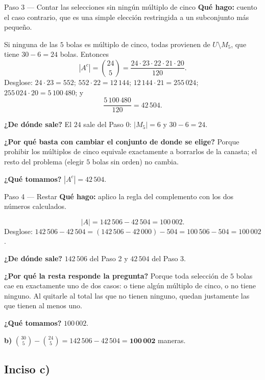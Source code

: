 \documentclass[11pt]{article}
\begin{document}
\begin{paso}{Paso 3 --- Contar las selecciones sin ningún múltiplo de cinco}
\textbf{Qué hago:} cuento el caso contrario, que es una simple elección restringida a un subconjunto más pequeño.

Si ninguna de las $5$ bolas es múltiplo de cinco, todas provienen de $U\setminus M_5$, que tiene $30-6=24$ bolas. Entonces
\[
|A^{c}| = \binom{24}{5} = \frac{24\cdot 23\cdot 22\cdot 21\cdot 20}{120} .
\]
Desglose: $24\cdot 23 = 552$; $552\cdot 22 = 12\,144$; $12\,144\cdot 21 = 255\,024$; $255\,024\cdot 20 = 5\,100\,480$; y
\[
\frac{5\,100\,480}{120} = 42\,504 .
\]

\textbf{¿De dónde sale?} El $24$ sale del Paso 0: $|M_5|=6$ y $30-6=24$.

\textbf{¿Por qué basta con cambiar el conjunto de donde se elige?} Porque prohibir los múltiplos de cinco equivale exactamente a borrarlos de la canasta; el resto del problema (elegir $5$ bolas sin orden) no cambia.

\textbf{¿Qué tomamos?} $|A^c| = 42\,504$.
\end{paso}

\begin{paso}{Paso 4 --- Restar}
\textbf{Qué hago:} aplico la regla del complemento con los dos números calculados.

\[
|A| = 142\,506 - 42\,504 = 100\,002 .
\]
Desglose: $142\,506-42\,504 = (142\,506-42\,000)-504 = 100\,506-504 = 100\,002$.

\textbf{¿De dónde sale?} $142\,506$ del Paso 2 y $42\,504$ del Paso 3.

\textbf{¿Por qué la resta responde la pregunta?} Porque toda selección de $5$ bolas cae en exactamente uno de dos casos: o tiene algún múltiplo de cinco, o no tiene ninguno. Al quitarle al total las que no tienen ninguno, quedan justamente las que tienen al menos uno.

\textbf{¿Qué tomamos?} $100\,002$.
\end{paso}

\begin{resp}
\textbf{b)} $\displaystyle \binom{30}{5}-\binom{24}{5} = 142\,506-42\,504 = \mathbf{100\,002}$ maneras.
\end{resp}

\subsection*{Inciso c)}
\end{document}
